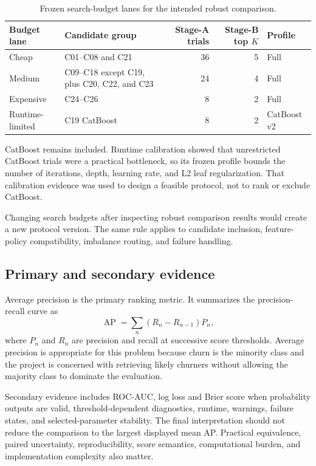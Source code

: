 \begin{table}[H]
\centering
\caption{Frozen search-budget lanes for the intended robust comparison.}
\label{tab:final-comparison-budget-lanes}
\begin{tabular}{p{3.1cm}p{6.0cm}rrp{2.1cm}}
\toprule
Budget lane & Candidate group & Stage-A trials & Stage-B top $K$ & Profile \\
\midrule
Cheap & C01--C08 and C21 & 36 & 5 & Full \\
Medium & C09--C18 except C19, plus C20, C22, and C23 & 24 & 4 & Full \\
Expensive & C24--C26 & 8 & 2 & Full \\
Runtime-limited & C19 CatBoost & 8 & 2 & CatBoost v2 \\
\bottomrule
\end{tabular}
\end{table}

CatBoost remains included. Runtime calibration showed that unrestricted CatBoost trials were a practical bottleneck, so its frozen profile bounds the number of iterations, depth, learning rate, and L2 leaf regularization. That calibration evidence was used to design a feasible protocol, not to rank or exclude CatBoost.

Changing search budgets after inspecting robust comparison results would create a new protocol version. The same rule applies to candidate inclusion, feature-policy compatibility, imbalance routing, and failure handling.

\subsection{Primary and secondary evidence}

Average precision is the primary ranking metric. It summarizes the precision-recall curve as
\[
\operatorname{AP}
=
\sum_n
\left(R_n-R_{n-1}\right)P_n,
\]
where $P_n$ and $R_n$ are precision and recall at successive score thresholds. Average precision is appropriate for this problem because churn is the minority class and the project is concerned with retrieving likely churners without allowing the majority class to dominate the evaluation.

Secondary evidence includes ROC-AUC, log loss and Brier score when probability outputs are valid, threshold-dependent diagnostics, runtime, warnings, failure states, and selected-parameter stability. The final interpretation should not reduce the comparison to the largest displayed mean AP. Practical equivalence, paired uncertainty, reproducibility, score semantics, computational burden, and implementation complexity also matter.

